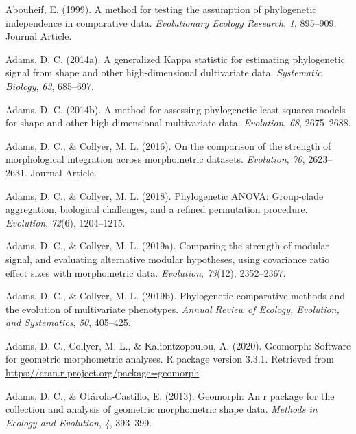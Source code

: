 \documentclass[
]{article}
\newlength{\cslhangindent}
\newenvironment{CSLReferences}[2] %
 {%
  \setlength{\parindent}{0pt}
  \ifodd #1 \everypar{\setlength{\hangindent}{\cslhangindent}}\ignorespaces\fi
  \ifnum #2 > 0
  \setlength{\parskip}{#2\baselineskip}
  \fi
 }%
 {}
\begin{document}
\hypertarget{refs}{}
\begin{CSLReferences}{1}{0}
\leavevmode{}%
Abouheif, E. (1999). A method for testing the assumption of phylogenetic
independence in comparative data. \emph{Evolutionary Ecology Research},
\emph{1}, 895--909. Journal Article.

\leavevmode{}%
Adams, D. C. (2014a). {A generalized Kappa statistic for estimating
phylogenetic signal from shape and other high-dimensional dultivariate
data}. \emph{Systematic Biology}, \emph{63}, 685--697.

\leavevmode{}%
Adams, D. C. (2014b). A method for assessing phylogenetic least squares
models for shape and other high-dimensional multivariate data.
\emph{Evolution}, \emph{68}, 2675--2688.

\leavevmode{}%
Adams, D. C., \& Collyer, M. L. (2016). On the comparison of the
strength of morphological integration across morphometric datasets.
\emph{Evolution}, \emph{70}, 2623--2631. Journal Article.

\leavevmode{}%
Adams, D. C., \& Collyer, M. L. (2018). Phylogenetic ANOVA: Group-clade
aggregation, biological challenges, and a refined permutation procedure.
\emph{Evolution}, \emph{72}(6), 1204--1215.

\leavevmode{}%
Adams, D. C., \& Collyer, M. L. (2019a). Comparing the strength of
modular signal, and evaluating alternative modular hypotheses, using
covariance ratio effect sizes with morphometric data. \emph{Evolution},
\emph{73}(12), 2352--2367.

\leavevmode{}%
Adams, D. C., \& Collyer, M. L. (2019b). Phylogenetic comparative
methods and the evolution of multivariate phenotypes. \emph{Annual
Review of Ecology, Evolution, and Systematics}, \emph{50}, 405--425.

\leavevmode{}%
Adams, D. C., Collyer, M. L., \& Kaliontzopoulou, A. (2020). Geomorph:
Software for geometric morphometric analyses. R package version 3.3.1.
Retrieved from \url{https://cran.r-project.org/package=geomorph}

\leavevmode{}%
Adams, D. C., \& Otárola-Castillo, E. (2013). Geomorph: An r package for
the collection and analysis of geometric morphometric shape data.
\emph{Methods in Ecology and Evolution}, \emph{4}, 393--399.


\end{CSLReferences}
\end{document}
